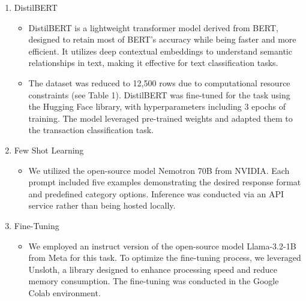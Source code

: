 \documentclass[12pt,letterpaper]{article}
\begin{document}
\begin{enumerate}
        \item {DistilBERT}
            \begin{itemize}
                \item {DistilBERT is a lightweight transformer model derived from BERT, designed to retain most of BERT’s accuracy while being faster and more efficient. It utilizes deep contextual embeddings to understand semantic relationships in text, making it effective for text classification tasks.}
                \item {The dataset was reduced to 12,500 rows due to computational resource constraints (see Table 1). DistilBERT was fine-tuned for the task using the Hugging Face library, with hyperparameters including 3 epochs of training. The model leveraged pre-trained weights and adapted them to the transaction classification task.}
            \end{itemize}
        \item {Few Shot Learning}
            \begin{itemize}
                \item {We utilized the open-source model Nemotron 70B from NVIDIA. Each prompt included five examples demonstrating the desired response format and predefined category options. Inference was conducted via an API service rather than being hosted locally.}
            \end{itemize}
        \item {Fine-Tuning}
            \begin{itemize}
                \item{We employed an instruct version of the open-source model Llama-3.2-1B from Meta for this task. To optimize the fine-tuning process, we leveraged Unsloth, a library designed to enhance processing speed and reduce memory consumption. The fine-tuning was conducted in the Google Colab environment.}
            \end{itemize}
    \end{enumerate}


\vspace{10cm} 
\end{document}
